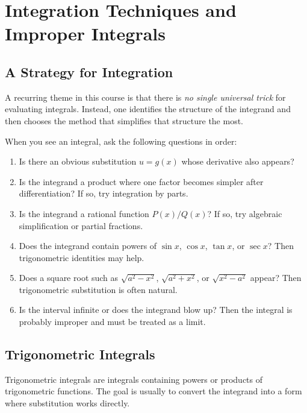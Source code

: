 \chapter*{Integration Techniques and Improper Integrals}

\section*{A Strategy for Integration}

A recurring theme in this course is that there is \emph{no single universal trick} for evaluating integrals. Instead, one identifies the structure of the integrand and then chooses the method that simplifies that structure the most.

\begin{remark}
When you see an integral, ask the following questions in order:
\begin{enumerate}[label=\arabic*.]
    \item Is there an obvious substitution $u=g(x)$ whose derivative also appears?
    \item Is the integrand a product where one factor becomes simpler after differentiation? If so, try integration by parts.
    \item Is the integrand a rational function $P(x)/Q(x)$? If so, try algebraic simplification or partial fractions.
    \item Does the integrand contain powers of $\sin x$, $\cos x$, $\tan x$, or $\sec x$? Then trigonometric identities may help.
    \item Does a square root such as $\sqrt{a^2-x^2}$, $\sqrt{a^2+x^2}$, or $\sqrt{x^2-a^2}$ appear? Then trigonometric substitution is often natural.
    \item Is the interval infinite or does the integrand blow up? Then the integral is probably improper and must be treated as a limit.
\end{enumerate}
\end{remark}

\section*{Trigonometric Integrals}

Trigonometric integrals are integrals containing powers or products of trigonometric functions. The goal is usually to convert the integrand into a form where substitution works directly.

